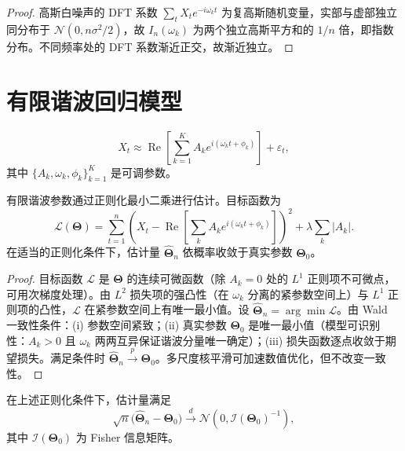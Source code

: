 \begin{proof}
高斯白噪声的 DFT 系数 $\sum_tX_te^{-i\omega_kt}$ 为复高斯随机变量，实部与虚部独立同分布于 $\mathcal{N}(0,n\sigma^2/2)$，故 $I_n(\omega_k)$ 为两个独立高斯平方和的 $1/n$ 倍，即指数分布。不同频率处的 DFT 系数渐近正交，故渐近独立。
\end{proof}

\section{有限谐波回归模型}

\begin{definition}[有限谐波回归模型]\label{def:ts_harmonic_regression}
\[
X_t \approx \operatorname{Re}\left[ \sum_{k=1}^{K} A_k e^{i(\omega_k t + \phi_k)} \right] + \varepsilon_t,
\]
其中 $\{A_k, \omega_k, \phi_k\}_{k=1}^{K}$ 是可调参数。
\end{definition}

\begin{proposition}[有限谐波模型参数的正则化最小二乘估计]\label{prop:ts_harmonic_estimate}
有限谐波参数通过正则化最小二乘进行估计。目标函数为
\[
\mathcal{L}(\boldsymbol{\Theta}) = \sum_{t=1}^n \left( X_t - \operatorname{Re}\left[\sum_k A_k e^{i(\omega_k t + \phi_k)}\right] \right)^2 + \lambda \sum_k |A_k|.
\]
在适当的正则化条件下，估计量 $\hat{\boldsymbol{\Theta}}_n$ 依概率收敛于真实参数 $\boldsymbol{\Theta}_0$。
\end{proposition}

\begin{proof}
目标函数 $\mathcal{L}$ 是 $\boldsymbol{\Theta}$ 的连续可微函数（除 $A_k = 0$ 处的 $L^1$ 正则项不可微点，可用次梯度处理）。由 $L^2$ 损失项的强凸性（在 $\omega_k$ 分离的紧参数空间上）与 $L^1$ 正则项的凸性，$\mathcal{L}$ 在紧参数空间上有唯一最小值。设 $\hat{\boldsymbol{\Theta}}_n = \arg\min \mathcal{L}$。由 Wald 一致性条件：(i) 参数空间紧致；(ii) 真实参数 $\boldsymbol{\Theta}_0$ 是唯一最小值（模型可识别性：$A_k > 0$ 且 $\omega_k$ 两两互异保证谐波分量唯一确定）；(iii) 损失函数逐点收敛于期望损失。满足条件时 $\hat{\boldsymbol{\Theta}}_n \xrightarrow{p} \boldsymbol{\Theta}_0$。多尺度核平滑可加速数值优化，但不改变一致性。
\end{proof}

\begin{theorem}[有限谐波估计的渐近正态性]\label{thm:ts_harmonic_asymptotic}
在上述正则化条件下，估计量满足
\[
\sqrt{n}\bigl(\hat{\boldsymbol{\Theta}}_n-\boldsymbol{\Theta}_0\bigr)\xrightarrow{d}\mathcal{N}(0,\mathcal{I}(\boldsymbol{\Theta}_0)^{-1}),
\]
其中 $\mathcal{I}(\boldsymbol{\Theta}_0)$ 为 Fisher 信息矩阵。
\end{theorem}

